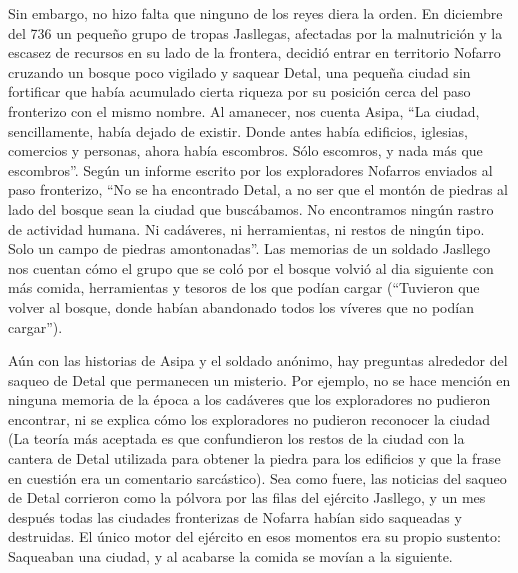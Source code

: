 Sin embargo, no hizo falta que ninguno de los reyes diera la orden. En diciembre del 736 un pequeño grupo de tropas Jasllegas, afectadas por la malnutrición y la escasez de recursos en su lado de la frontera, decidió entrar en territorio Nofarro cruzando un bosque poco vigilado y saquear Detal, una pequeña ciudad sin fortificar que había acumulado cierta riqueza por su posición cerca del paso fronterizo con el mismo nombre. Al amanecer, nos cuenta Asipa, ``La ciudad, sencillamente, había dejado de existir. Donde antes había edificios, iglesias, comercios y personas, ahora había escombros. Sólo escomros, y nada más que escombros''. Según un informe escrito por los exploradores Nofarros enviados al paso fronterizo, ``No se ha encontrado Detal, a no ser que el montón de piedras al lado del bosque sean la ciudad que buscábamos. No encontramos ningún rastro de actividad humana. Ni cadáveres, ni herramientas, ni restos de ningún tipo. Solo un campo de piedras amontonadas''. Las memorias de un soldado Jasllego nos cuentan cómo el grupo que se coló por el bosque volvió al dia siguiente con más comida, herramientas y tesoros de los que podían cargar (``Tuvieron que volver al bosque, donde habían abandonado todos los víveres que no podían cargar''). 
\par
Aún con las historias de Asipa y el soldado anónimo, hay preguntas alrededor del saqueo de Detal que permanecen un misterio. Por ejemplo, no se hace mención en ninguna memoria de la época a los cadáveres que los exploradores no pudieron encontrar, ni se explica cómo los exploradores no pudieron reconocer la ciudad (La teoría más aceptada es que confundieron los restos de la ciudad con la cantera de Detal utilizada para obtener la piedra para los edificios y que la frase en cuestión era un comentario sarcástico). Sea como fuere, las noticias del saqueo de Detal corrieron como la pólvora por las filas del ejército Jasllego, y un mes después todas las ciudades fronterizas de Nofarra habían sido saqueadas y destruidas. El único motor del ejército en esos momentos era su propio sustento: Saqueaban una ciudad, y al acabarse la comida se movían a la siguiente. 
\par 
